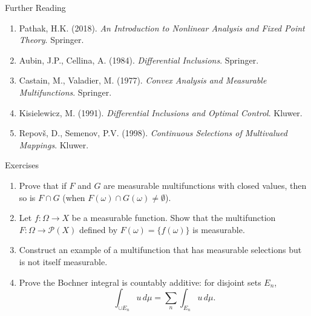 \documentclass[aspectratio=169,10pt]{beamer}
\begin{document}
\begin{frame}{Further Reading}
\begin{enumerate}
    \item Pathak, H.K. (2018). \textit{An Introduction to Nonlinear Analysis and Fixed Point Theory}. Springer.

    \item Aubin, J.P., Cellina, A. (1984). \textit{Differential Inclusions}. Springer.

    \item Castain, M., Valadier, M. (1977). \textit{Convex Analysis and Measurable Multifunctions}. Springer.

    \item Kisielewicz, M. (1991). \textit{Differential Inclusions and Optimal Control}. Kluwer.

    \item Repovš, D., Semenov, P.V. (1998). \textit{Continuous Selections of Multivalued Mappings}. Kluwer.
\end{enumerate}
\end{frame}

\begin{frame}{Exercises}
\begin{enumerate}
    \item Prove that if $F$ and $G$ are measurable multifunctions with closed values, then so is $F \cap G$ (when $F(\omega) \cap G(\omega) \neq \emptyset$).

    \item Let $f: \Omega \to X$ be a measurable function. Show that the multifunction $F: \Omega \to \mathcal{P}(X)$ defined by $F(\omega) = \{f(\omega)\}$ is measurable.

    \item Construct an example of a multifunction that has measurable selections but is not itself measurable.

    \item Prove the Bochner integral is countably additive: for disjoint sets $E_n$,
    $$\int_{\cup E_n} u \, d\mu = \sum_n \int_{E_n} u \, d\mu.$$
\end{enumerate}
\end{frame}
\end{document}
